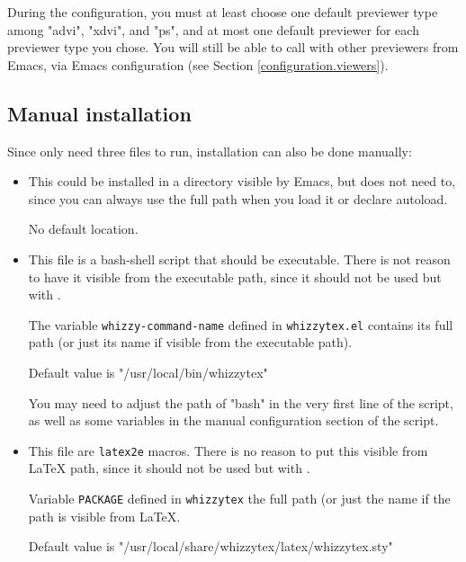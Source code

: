 \documentclass[12pt]{article}
\begin{document}
During the configuration, you must at least choose one default previewer
type among \lst"advi", \lst"xdvi", and \lst"ps", and at most one default
previewer for each previewer type you chose. You will still be able to call
{\whizzy} with other previewers from Emacs, via Emacs configuration (see
Section
\ref {configuration.viewers}).

\subsection {Manual installation}

Since {\whizzy} only need three files to run, installation can also be done
manually:
\begin {itemize}

\item[]\hspace{-2em}{\tt whizzytex.el}

This could be installed in a directory visible by Emacs, but does not need
to, since you can always use the full path when you load it or declare
autoload.

No default location.

\item[]\hspace {-2em}{\tt whizzytex}

This file is a bash-shell script that should be executable.  There is not
reason to have it visible from the executable path, since it should not be
used but with {\whizzy}.

The variable {\tt whizzy-command-name} defined in {\tt whizzytex.el}
contains its full path (or just its name if visible from the executable
path).

Default value is \lst"/usr/local/bin/whizzytex"

You may  need to adjust the path of \lst"bash" in the very first line of the
script, as well as some variables in the manual configuration section of the
script.

\item[]\hspace{-2em}{\tt whizzytex.sty}

This file are {\tt latex2e} macros. There is no reason to put this visible
from {\LaTeX} path, since it should not be used but with {\whizzy}.

Variable  {\tt PACKAGE} defined in {\tt whizzytex}
the full path (or just the name if the path is visible from {\LaTeX}.

Default value is \lst"/usr/local/share/whizzytex/latex/whizzytex.sty"

\end {itemize}
\end{document}
